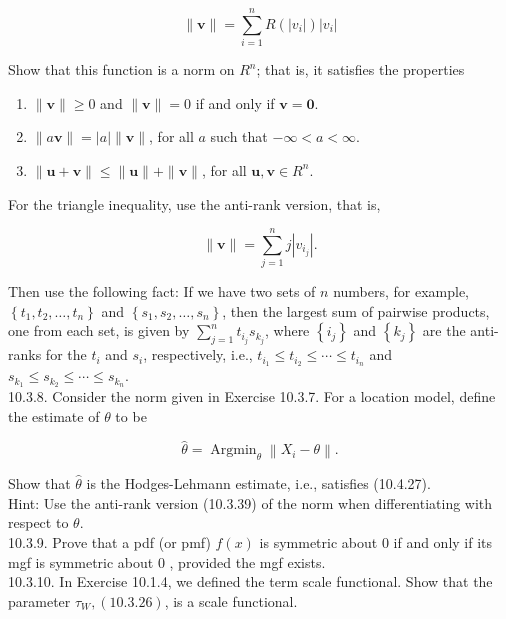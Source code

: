\begin{equation*}
\|\mathbf{v}\|=\sum_{i=1}^{n} R\left(\left|v_{i}\right|\right)\left|v_{i}\right| \tag{10.3.38}
\end{equation*}


Show that this function is a norm on $R^{n}$; that is, it satisfies the properties

\begin{enumerate}
  \item $\|\mathbf{v}\| \geq 0$ and $\|\mathbf{v}\|=0$ if and only if $\mathbf{v}=\mathbf{0}$.
  \item $\|a \mathbf{v}\|=|a|\|\mathbf{v}\|$, for all $a$ such that $-\infty<a<\infty$.
  \item $\|\mathbf{u}+\mathbf{v}\| \leq\|\mathbf{u}\|+\|\mathbf{v}\|$, for all $\mathbf{u}, \mathbf{v} \in R^{n}$.
\end{enumerate}

For the triangle inequality, use the anti-rank version, that is,


\begin{equation*}
\|\mathbf{v}\|=\sum_{j=1}^{n} j\left|v_{i_{j}}\right| . \tag{10.3.39}
\end{equation*}


Then use the following fact: If we have two sets of $n$ numbers, for example, $\left\{t_{1}, t_{2}, \ldots, t_{n}\right\}$ and $\left\{s_{1}, s_{2}, \ldots, s_{n}\right\}$, then the largest sum of pairwise products, one from each set, is given by $\sum_{j=1}^{n} t_{i_{j}} s_{k_{j}}$, where $\left\{i_{j}\right\}$ and $\left\{k_{j}\right\}$ are the anti-ranks for the $t_{i}$ and $s_{i}$, respectively, i.e., $t_{i_{1}} \leq t_{i_{2}} \leq \cdots \leq t_{i_{n}}$ and $s_{k_{1}} \leq s_{k_{2}} \leq \cdots \leq s_{k_{n}}$.\\
10.3.8. Consider the norm given in Exercise 10.3.7. For a location model, define the estimate of $\theta$ to be


\begin{equation*}
\widehat{\theta}=\operatorname{Argmin}_{\theta}\left\|X_{i}-\theta\right\| . \tag{10.3.40}
\end{equation*}


Show that $\widehat{\theta}$ is the Hodges-Lehmann estimate, i.e., satisfies (10.4.27).\\
Hint: Use the anti-rank version (10.3.39) of the norm when differentiating with respect to $\theta$.\\
10.3.9. Prove that a pdf (or pmf) $f(x)$ is symmetric about 0 if and only if its mgf is symmetric about 0 , provided the mgf exists.\\
10.3.10. In Exercise 10.1.4, we defined the term scale functional. Show that the parameter $\tau_{W},(10.3 .26)$, is a scale functional.

